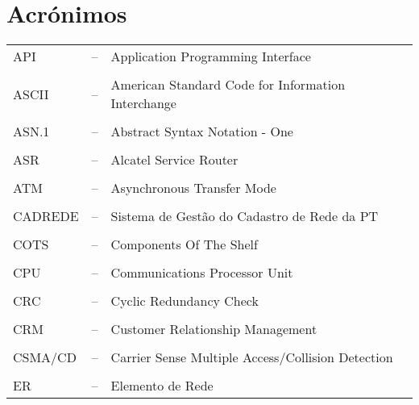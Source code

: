 \label{Acronym}
\section*{\huge{Acrónimos}}
\vspace{.3cm}
\begin{table}[H]
	\centering
	\begin{adjustbox}{width=1\textwidth}
		\small
		\begin{tabular}{ l c l }
			API	& –	\hspace{1cm} & Application Programming Interface \\
			\\
			ASCII & – \hspace{1cm} &	American Standard Code for Information Interchange \\
			\\
			ASN.1 & – \hspace{1cm} & Abstract Syntax Notation - One \\
			\\
			ASR & –	\hspace{1cm} & Alcatel Service Router \\
			\\
			ATM & – \hspace{1cm} & Asynchronous Transfer Mode \\
			\\
			CADREDE & –	\hspace{1cm} & Sistema de Gestão do Cadastro de Rede da PT \\
			\\
			COTS & – \hspace{1cm} &Components Of The Shelf \\
			\\
			CPU	& – \hspace{1cm} & Communications Processor Unit \\
			\\
			CRC & – \hspace{1cm} & Cyclic Redundancy Check \\
			\\
			CRM & – \hspace{1cm} & Customer Relationship Management \\
			\\
			CSMA/CD & – \hspace{1cm} & Carrier Sense Multiple Access/Collision Detection \\
			\\
			ER & – \hspace{1cm} & Elemento de Rede \\

\end{tabular}
\end{adjustbox}
\end{table}
